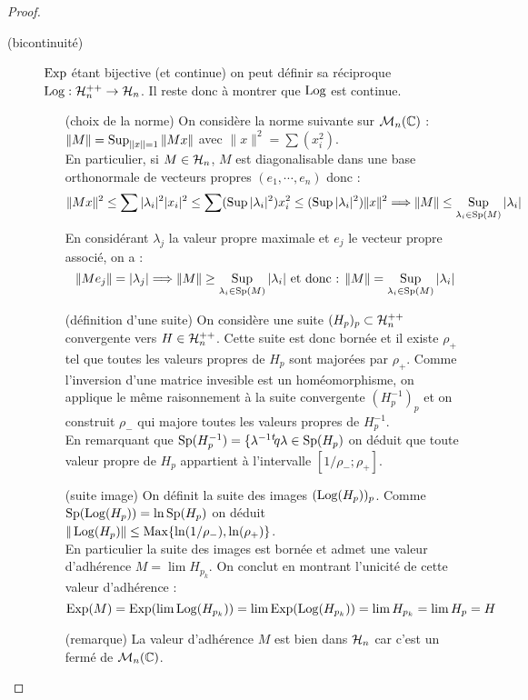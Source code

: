 \begin{proof}
\begin{description}
\item [(bicontinuité)] $\operatorname{Exp}$ étant bijective (et continue) on peut
définir sa réciproque $\operatorname{Log} : \mathcal{H}^{++}_n \rightarrow \mathcal{H}_n$. Il reste donc à montrer
que $\operatorname{Log}$ est continue.
\begin{itemize}
 \item[(choix de la norme)] On considère la norme suivante sur $\mathcal{M}_n(\mathbb{C})$ :
$|\negthinspace\hspace{0.07em}|M|\negthinspace\hspace{0.07em}|
= \operatorname*{Sup}_{|\negthinspace\hspace{0.07em}|x|\negthinspace\hspace{0.07em}| = 1} |\negthinspace\hspace{0.07em}|Mx|\negthinspace\hspace{0.07em}|$ avec $\|x\|^2=\sum(x_i^2)$.\\
En particulier, si $M\in\mathcal{H}_n$, $M$ est diagonalisable dans une base
orthonormale de vecteurs propres $(e_1,\cdots,e_n)$ donc :
\begin{displaymath}
 |\negthinspace\hspace{0.07em}|Mx|\negthinspace\hspace{0.07em}|^2 \leq \sum|\lambda_i|^2 |x_i|^2 \leq \sum (\operatorname*{Sup}|\lambda_i|^2)x_i^2 \leq
(\operatorname*{Sup} |\lambda_i|^2) |\negthinspace\hspace{0.07em}|x|\negthinspace\hspace{0.07em}|^2 \Longrightarrow |\negthinspace\hspace{0.07em}|M|\negthinspace\hspace{0.07em}|\leq
\operatorname*{Sup}_{\lambda_i\in\operatorname{Sp}(M)}|\lambda_i|
\end{displaymath}
En considérant $\lambda_j$ la valeur propre maximale et $e_j$ le vecteur propre
associé, on a :
\begin{displaymath}
 |\negthinspace\hspace{0.07em}|Me_j|\negthinspace\hspace{0.07em}| = |\lambda_j| \Longrightarrow |\negthinspace\hspace{0.07em}|M|\negthinspace\hspace{0.07em}|\geq
\operatorname*{Sup}_{\lambda_i\in\operatorname{Sp}(M)}|\lambda_i| \text { et donc : } |\negthinspace\hspace{0.07em}|M|\negthinspace\hspace{0.07em}| =
\operatorname*{Sup}_{\lambda_i\in\operatorname{Sp}(M)}|\lambda_i|
\end{displaymath}
\item[(définition d'une suite)] On considère une
suite $(H_p)_p \subset \mathcal{H}^{++}_n$ convergente vers $H \in \mathcal{H}^{++}_n$. Cette suite est
donc bornée et il existe $\rho_+$ tel que toutes les valeurs propres de
$H_p$ sont majorées par $\rho_+$. Comme l'inversion d'une matrice invesible est
un homéomorphisme, on applique le même raisonnement à la suite convergente
$(H_p^{-1})_p$ et on construit $\rho_-$ qui majore toutes les valeurs propres
de $H_p^{-1}$.\\ En remarquant que $\operatorname{Sp}(H_p^{-1})=\{\lambda^{-1} {}^t\! q
\lambda\in\operatorname{Sp}(H_p)$ on déduit que toute valeur propre de $H_p$ appartient
à l'intervalle $[1/\rho_-;\rho_+]$.
\item [(suite image)] On définit la suite des images $(\operatorname{Log}(H_p))_p$. Comme
$\operatorname{Sp}(\operatorname{Log}(H_p)) = \ln \operatorname{Sp}(H_p)$ on déduit $|\negthinspace\hspace{0.07em}|\operatorname{Log}(H_p)|\negthinspace\hspace{0.07em}|\leq \operatorname*{Max}
\{\ln(1/\rho_-) , \ln(\rho_+)\}$.\\
En particulier la suite des images est bornée et admet une valeur d'adhérence
$M=\lim H_{p_k}$. On conclut en montrant l'unicité de cette valeur d'adhérence
:
\begin{displaymath}
 \operatorname{Exp}(M) = \operatorname{Exp} (\lim \operatorname{Log}(H_{p_k})) = \lim \operatorname{Exp}(\operatorname{Log}(H_{p_k}))
 = \lim H_{p_k} = \lim H_p = H
\end{displaymath}
\item [(remarque)] La valeur d'adhérence $M$ est bien dans $\mathcal{H}_n$ car c'est un
fermé de $\mathcal{M}_n(\mathbb{C})$.
\end{itemize}
 \end{description}
\end{proof}

